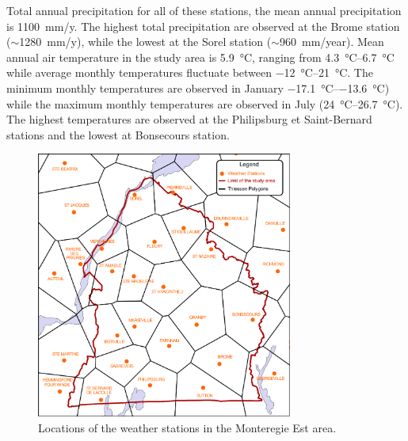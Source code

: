 \documentclass[TechnicalNoteMeteo.tex]{subfiles}
\begin{document}
Total annual precipitation for all of these stations, the mean annual precipitation is \SI{1100}{mm/y}. The highest total precipitation are observed at the Brome station ($\sim$\SI{1280}{mm/y}), while the lowest at the Sorel station ($\sim$\SI{960}{mm/year}). Mean annual air temperature in the study area is \SI{5.9}{\celsius}, ranging from \SIrange{4.3}{6.7}{\celsius} while average monthly temperatures fluctuate between \SIrange{-12}{21}{\celsius}. The minimum monthly temperatures are observed in January \SIrange{-17.1}{-13.6}{\celsius}) while the maximum monthly temperatures are observed in July (\SIrange{24}{26.7}{\celsius}).
The highest temperatures are observed at the Philipsburg et Saint-Bernard stations and the lowest at Bonsecours station.


\begin{figure}
\centering
\includegraphics[width=0.75\textwidth]{img/Thiessen_meteo}
\caption[Locations of the weather stations in the Monteregie Est area.]{Locations of the weather stations in the Monteregie Est area.}
\label{fig:Thiessen_meteo}
\end{figure}
\end{document}
